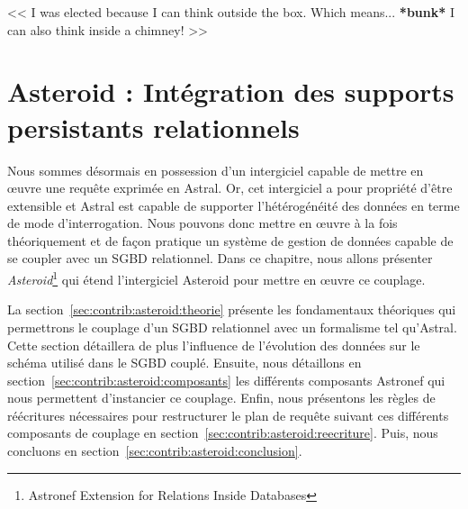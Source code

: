 \begin{savequote}[6cm]
<< I was elected because I can think outside the box. 
Which means... \textbf{*bunk*} I can also think inside a chimney! >>
\end{savequote}

\chapter{Asteroid : Intégration des supports persistants relationnels}\label{chap:contrib:asteroid}
\chaptertoc

Nous sommes désormais en possession d'un intergiciel capable de mettre en œuvre une requête exprimée en Astral. Or, cet intergiciel a pour propriété d'être extensible et Astral est capable de supporter l'hétérogénéité des données en terme de mode d'interrogation. Nous pouvons donc mettre en œuvre à la fois théoriquement et de façon pratique un système de gestion de données capable de se coupler avec un SGBD relationnel. Dans ce chapitre, nous allons présenter \textit{Asteroid}\footnote{Astronef Extension for Relations Inside Databases} qui étend l'intergiciel Asteroid pour mettre en œuvre ce couplage.

La section~\ref{sec:contrib:asteroid:theorie} présente les fondamentaux théoriques qui permettrons le couplage d'un SGBD relationnel avec un formalisme tel qu'Astral. Cette section détaillera de plus l'influence de l'évolution des données sur le schéma utilisé dans le SGBD couplé. Ensuite, nous détaillons en section~\ref{sec:contrib:asteroid:composants} les différents composants Astronef qui nous permettent d'instancier ce couplage. Enfin, nous présentons les règles de réécritures nécessaires pour restructurer le plan de requête suivant ces différents composants de couplage en section~\ref{sec:contrib:asteroid:reecriture}. Puis, nous concluons en section~\ref{sec:contrib:asteroid:conclusion}.





